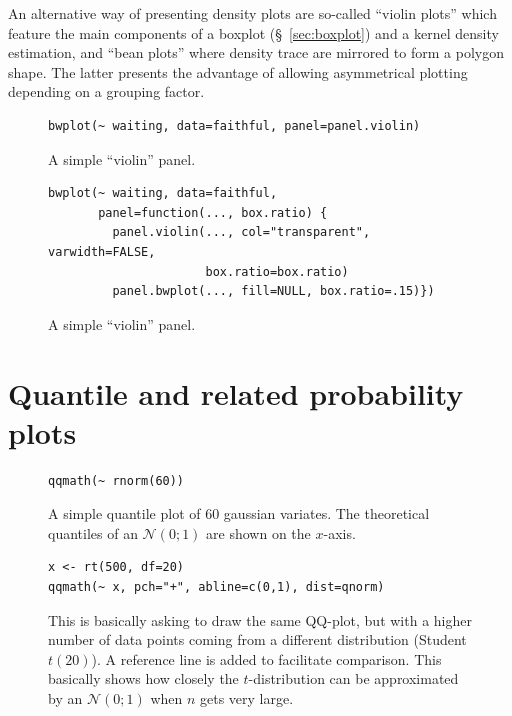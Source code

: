 \documentclass[a4paper,twoside]{book}
\newcounter{fig}
\newcommand{\img}[1]{\texttt{[image: \#1]}\stepcounter{fig}}
\renewcommand{\texttt}[1]{\lstinline{#1}}
\begin{document}
An alternative way of presenting density plots are so-called
``violin plots''\autocite{hintze98} which feature the main components
of a boxplot (\S~\ref{sec:boxplot}) and a kernel density estimation,
and ``bean plots''\autocite{kampstra08} where density trace are
mirrored to form a polygon shape. The latter presents the advantage of
allowing asymmetrical plotting depending on a grouping factor.

\begin{figure}[H]
\begin{lstlisting}
bwplot(~ waiting, data=faithful, panel=panel.violin)
\end{lstlisting}
  \fcapside[\FBwidth] {\img{figs_lattice-crop}}
  {\caption*{A simple ``violin'' panel.}}
\end{figure}

\begin{figure}[H]
\begin{lstlisting}
bwplot(~ waiting, data=faithful, 
       panel=function(..., box.ratio) {
         panel.violin(..., col="transparent", varwidth=FALSE, 
                      box.ratio=box.ratio)
         panel.bwplot(..., fill=NULL, box.ratio=.15)})
\end{lstlisting}
  \fcapside[\FBwidth] {\img{figs_lattice-crop}}
  {\caption*{A simple ``violin'' panel.}}
\end{figure}

\section{Quantile and related probability plots}
\lipsum[1]

\begin{figure}[H]
\begin{lstlisting}
qqmath(~ rnorm(60))
\end{lstlisting}
  \fcapside[\FBwidth] {\img{figs_lattice-crop}}
  {\caption*{A simple quantile plot of 60 gaussian variates. The
      theoretical quantiles of an $\mathcal{N}(0;1)$ are shown on the
      $x$-axis.}}
\end{figure}

\begin{figure}[H]
\begin{lstlisting}
x <- rt(500, df=20)
qqmath(~ x, pch="+", abline=c(0,1), dist=qnorm)
\end{lstlisting}
  \fcapside[\FBwidth] {\img{figs_lattice-crop}}
  {\caption*{This is basically asking to draw the same QQ-plot, but
      with a higher number of data points coming from a different
      distribution (Student $t(20)$). A reference line is added to
      facilitate comparison. This basically shows how closely the
      $t$-distribution can be approximated by an $\mathcal{N}(0;1)$
      when $n$ gets very large.}}
\end{figure}
\end{document}
